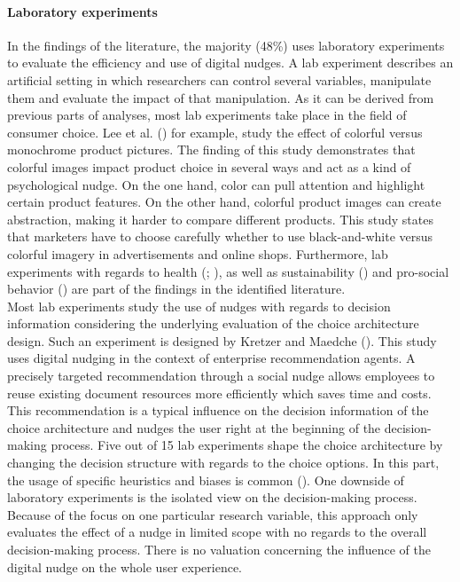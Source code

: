 \paragraph{Laboratory experiments}
In the findings of the literature, the majority (48\%) uses laboratory experiments to evaluate the efficiency and use of digital nudges. A lab experiment describes an artificial setting in which researchers can control several variables, manipulate them and evaluate the impact of that manipulation. As it can be derived from previous parts of analyses, most lab experiments take place in the field of consumer choice. Lee et al. (\citeyear{lee_monochrome_2014}) for example, study the effect of colorful versus monochrome product pictures. The finding of this study demonstrates that colorful images impact product choice in several ways and act as a kind of psychological nudge.
On the one hand, color can pull attention and highlight certain product features. On the other hand, colorful product images can create abstraction, making it harder to compare different products. This study states that marketers have to choose carefully whether to use black-and-white versus colorful imagery in advertisements and online shops.
Furthermore, lab experiments with regards to health (\cite{laran_nonconscious_2018}; \cite{langley_should_2015}), as well as sustainability (\cite{bruns_can_2018}) and pro-social behavior (\cite{zarghamee_nudging_2017}) are part of the findings in the identified literature. 
\\

Most lab experiments study the use of nudges with regards to decision information considering the underlying evaluation of the choice architecture design. Such an experiment is designed by Kretzer and Maedche (\citeyear{kretzer_designing_2018}). This study uses digital nudging in the context of enterprise recommendation agents. A precisely targeted recommendation through a social nudge allows employees to reuse existing document resources more efficiently which saves time and costs. This recommendation is a typical influence on the decision information of the choice architecture and nudges the user right at the beginning of the decision-making process.  
Five out of 15 lab experiments shape the choice architecture by changing the decision structure with regards to the choice options. In this part, the usage of specific heuristics and biases is common (\cite{tversky_judgment_1974}).
One downside of laboratory experiments is the isolated view on the decision-making process. Because of the focus on one particular research variable, this approach only evaluates the effect of a nudge in limited scope with no regards to the overall decision-making process. There is no valuation concerning the influence of the digital nudge on the whole user experience. %
 
